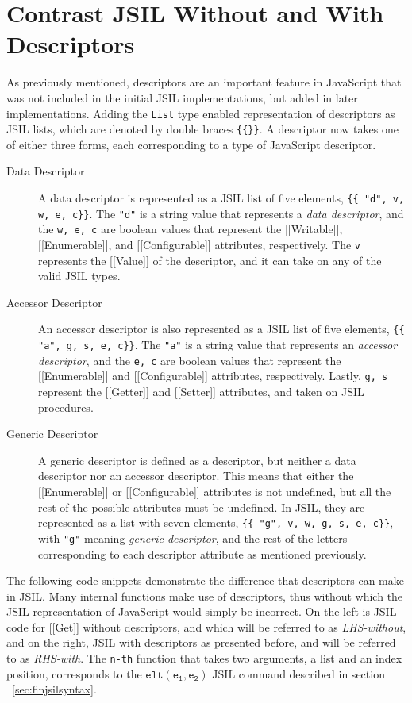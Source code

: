 \documentclass[a4paper,11pt,twoside]{report}
\begin{document}
\section{Contrast JSIL Without and With Descriptors}
As previously mentioned, descriptors are an important feature in JavaScript that was not included in the initial JSIL implementations, but added in later implementations. Adding the \texttt{List} type enabled representation of descriptors as JSIL lists, which are denoted by double braces \texttt{\{\{\}\}}. A descriptor now takes one of either three forms, each corresponding to a type of JavaScript descriptor.
\begin{description}
\item[Data Descriptor] A data descriptor is represented as a JSIL list of five elements, \texttt{\{\{ "d", v, w, e, c\}\}}. The \texttt{"d"} is a string value that represents a \textit{data descriptor}, and the \texttt{w, e, c} are boolean values that represent the [[Writable]], [[Enumerable]], and [[Configurable]] attributes, respectively. The \texttt{v} represents the [[Value]] of the descriptor, and it can take on any of the valid JSIL types.
\item[Accessor Descriptor] An accessor descriptor is also represented as a JSIL list of five elements, \texttt{\{\{ "a", g, s, e, c\}\}}. The \texttt{"a"} is a string value that represents an \textit{accessor descriptor}, and the \texttt{e, c} are boolean values that represent the [[Enumerable]] and [[Configurable]] attributes, respectively. Lastly, \texttt{g, s} represent the [[Getter]] and [[Setter]] attributes, and taken on JSIL procedures.
\item[Generic Descriptor] A generic descriptor is defined as a descriptor, but neither a data descriptor nor an accessor descriptor. This means that either the [[Enumerable]] or [[Configurable]] attributes is not undefined, but all the rest of the possible attributes must be undefined. In JSIL, they are represented as a list with seven elements, \texttt{\{\{ "g", v, w, g, s, e, c\}\}}, with \texttt{"g"} meaning \textit{generic descriptor}, and the rest of the letters corresponding to each descriptor attribute as mentioned previously. 
\end{description}

The following code snippets demonstrate the difference that descriptors can make in JSIL. Many internal functions make use of descriptors, thus without which the JSIL representation of JavaScript would simply be incorrect. On the left is JSIL code for [[Get]] without descriptors, and which will be referred to as \textit{LHS-without}, and on the right, JSIL with descriptors as presented before, and will be referred to as \textit{RHS-with}. The \texttt{n-th} function that takes two arguments, a list and an index position, corresponds to the $\mathtt{elt (e_1, e_2)}$ JSIL command described in section ~\ref{sec:finjsilsyntax}.
\end{document}
